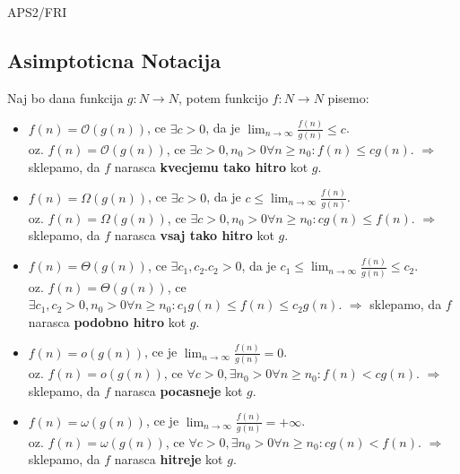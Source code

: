 \documentclass{article}
\begin{document}
\begin{center}
    {\small APS2/FRI \par}
\end{center}


\begin{multicols}{4}

\section{Asimptoticna Notacija}

Naj bo dana funkcija $g: N \rightarrow N$, potem funkcijo $f: N \rightarrow N$ pisemo:
\begin{itemize}
    \item $f(n) = \mathcal{O}(g(n))$, ce $\exists c > 0$, da je $\lim_{n \rightarrow \infty} \frac{f(n)}{g(n)} \leq c$.\\
        oz. $f(n) = \mathcal{O}(g(n))$, ce $\exists c > 0, n_0 > 0  \forall n \geq n_0: f(n) \leq cg(n)$. $\Rightarrow$
        sklepamo, da $f$ narasca \textbf{kvecjemu tako hitro} kot $g$.
    \item $f(n) = \Omega(g(n))$, ce $\exists c > 0$, da je $c \leq \lim_{n \rightarrow \infty} \frac{f(n)}{g(n)}$.\\
        oz. $f(n) = \Omega(g(n))$, ce $\exists c > 0, n_0 > 0  \forall n \geq n_0: cg(n) \leq f(n)$. $\Rightarrow$
        sklepamo, da $f$ narasca \textbf{vsaj tako hitro} kot $g$.
    \item $f(n) = \Theta(g(n))$, ce $\exists c_1, c_2. c_2 > 0$, da je $c_1 \leq \lim_{n \rightarrow \infty} \frac{f(n)}{g(n)} \leq c_2$.\\
        oz. $f(n) = \Theta(g(n))$, ce $\exists c_1, c_2 > 0, n_0 > 0  \forall n \geq n_0: c_1 g(n) \leq f(n) \leq c_2 g(n)$. $\Rightarrow$
        sklepamo, da $f$ narasca \textbf{podobno hitro} kot $g$.
    \item $f(n) = o(g(n))$, ce je $\lim_{n \rightarrow \infty} \frac{f(n)}{g(n)} = 0$.\\
        oz. $f(n) = o(g(n))$, ce $\forall c > 0, \exists n_0 > 0  \forall n \geq n_0: f(n) < cg(n)$. $\Rightarrow$
        sklepamo, da $f$ narasca \textbf{pocasneje} kot $g$.
    \item $f(n) = \omega(g(n))$, ce  je $ \lim_{n \rightarrow \infty} \frac{f(n)}{g(n)} = + \infty$.\\
        oz. $f(n) = \omega(g(n))$, ce $\forall c > 0, \exists n_0 > 0  \forall n \geq n_0: cg(n) < f(n)$. $\Rightarrow$
        sklepamo, da $f$ narasca \textbf{hitreje} kot $g$.
\end{itemize}


\end{multicols}
\end{document}
